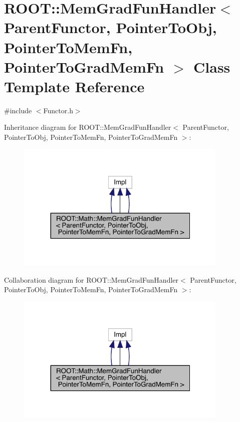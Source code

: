 \hypertarget{classROOT_1_1Math_1_1MemGradFunHandler}{}\section{R\+O\+OT\+:\+:Mem\+Grad\+Fun\+Handler$<$ Parent\+Functor, Pointer\+To\+Obj, Pointer\+To\+Mem\+Fn, Pointer\+To\+Grad\+Mem\+Fn $>$ Class Template Reference}
\label{classROOT_1_1Math_1_1MemGradFunHandler}


{\ttfamily \#include $<$Functor.\+h$>$}



Inheritance diagram for R\+O\+OT\+:\+:Mem\+Grad\+Fun\+Handler$<$ Parent\+Functor, Pointer\+To\+Obj, Pointer\+To\+Mem\+Fn, Pointer\+To\+Grad\+Mem\+Fn $>$\+:
\nopagebreak
\begin{figure}[H]
\begin{center}
\leavevmode
\includegraphics[width=287pt]{d3/dfc/classROOT_1_1Math_1_1MemGradFunHandler__inherit__graph}
\end{center}
\end{figure}


Collaboration diagram for R\+O\+OT\+:\+:Mem\+Grad\+Fun\+Handler$<$ Parent\+Functor, Pointer\+To\+Obj, Pointer\+To\+Mem\+Fn, Pointer\+To\+Grad\+Mem\+Fn $>$\+:
\nopagebreak
\begin{figure}[H]
\begin{center}
\leavevmode
\includegraphics[width=287pt]{d0/d1b/classROOT_1_1Math_1_1MemGradFunHandler__coll__graph}
\end{center}
\end{figure}

